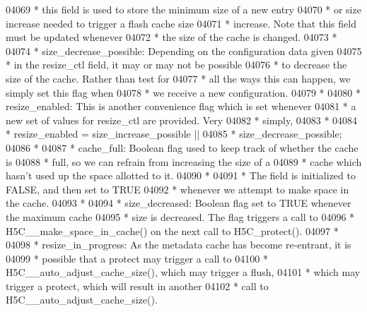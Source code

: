 \begin{DoxyCode}
04069 \textcolor{comment}{ *              this field is used to store the minimum size of a new entry}
04070 \textcolor{comment}{ *              or size increase needed to trigger a flash cache size}
04071 \textcolor{comment}{ *              increase.  Note that this field must be updated whenever}
04072 \textcolor{comment}{ *              the size of the cache is changed.}
04073 \textcolor{comment}{ *}
04074 \textcolor{comment}{ * size\_decrease\_possible:  Depending on the configuration data given}
04075 \textcolor{comment}{ *              in the resize\_ctl field, it may or may not be possible}
04076 \textcolor{comment}{ *              to decrease the size of the cache.  Rather than test for}
04077 \textcolor{comment}{ *              all the ways this can happen, we simply set this flag when}
04078 \textcolor{comment}{ *              we receive a new configuration.}
04079 \textcolor{comment}{ *}
04080 \textcolor{comment}{ * resize\_enabled:  This is another convenience flag which is set whenever}
04081 \textcolor{comment}{ *      a new set of values for resize\_ctl are provided.  Very}
04082 \textcolor{comment}{ *      simply,}
04083 \textcolor{comment}{ *}
04084 \textcolor{comment}{ *          resize\_enabled = size\_increase\_possible ||}
04085 \textcolor{comment}{ *                                   size\_decrease\_possible;}
04086 \textcolor{comment}{ *}
04087 \textcolor{comment}{ * cache\_full:  Boolean flag used to keep track of whether the cache is}
04088 \textcolor{comment}{ *      full, so we can refrain from increasing the size of a}
04089 \textcolor{comment}{ *      cache which hasn't used up the space allotted to it.}
04090 \textcolor{comment}{ *}
04091 \textcolor{comment}{ *      The field is initialized to FALSE, and then set to TRUE}
04092 \textcolor{comment}{ *      whenever we attempt to make space in the cache.}
04093 \textcolor{comment}{ *}
04094 \textcolor{comment}{ * size\_decreased:  Boolean flag set to TRUE whenever the maximum cache}
04095 \textcolor{comment}{ *      size is decreased.  The flag triggers a call to}
04096 \textcolor{comment}{ *      H5C\_\_make\_space\_in\_cache() on the next call to H5C\_protect().}
04097 \textcolor{comment}{ *}
04098 \textcolor{comment}{ * resize\_in\_progress: As the metadata cache has become re-entrant, it is }
04099 \textcolor{comment}{ *      possible that a protect may trigger a call to }
04100 \textcolor{comment}{ *      H5C\_\_auto\_adjust\_cache\_size(), which may trigger a flush,}
04101 \textcolor{comment}{ *      which may trigger a protect, which will result in another }
04102 \textcolor{comment}{ *      call to H5C\_\_auto\_adjust\_cache\_size().  }

\end{DoxyCode}
